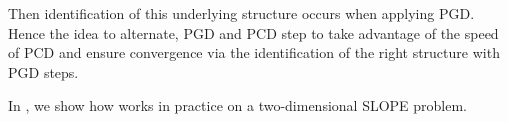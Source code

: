 Then identification of this underlying structure occurs when applying PGD.
Hence the idea to alternate, PGD and PCD step to take advantage of the speed of PCD and ensure convergence via the identification of the right structure with PGD steps.

\begin{algorithm}[htb]
  \caption{%
    Hybrid coordinate descent and proximal gradient descent algorithm
    for SLOPE\label{alg:hybrid}}


  \Return{\(\beta\)}
\end{algorithm}

In , we show how  works in practice on
a two-dimensional SLOPE problem.

